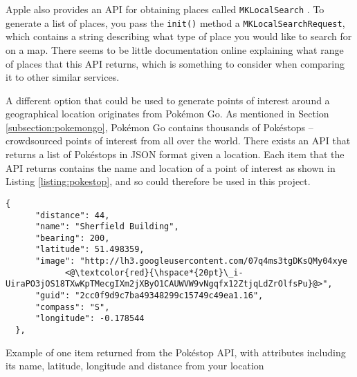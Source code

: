 Apple also provides an API for obtaining places called \texttt{MKLocalSearch} \cite{AppleInc.b}. To generate a list of places, you pass the \texttt{init()} method a \texttt{MKLocalSearchRequest}, which contains a string describing what type of place you would like to search for on a map. There seems to be little documentation online explaining what range of places that this API returns, which is something to consider when comparing it to other similar services.

A different option that could be used to generate points of interest around a geographical location originates from Pok\'{e}mon Go. As mentioned in Section \ref{subsection:pokemongo}, Pok\'{e}mon Go contains thousands of Pok\'{e}stops -- crowdsourced points of interest from all over the world. There exists an API \cite{Selwyn} that returns a list of Pok\'{e}stops in JSON format given a location. Each item that the API returns contains the name and location of a point of interest as shown in Listing \ref{listing:pokestop}, and so could therefore be used in this project.

\begin{listing}
  \centering
  \begin{lstlisting}[style=json]
  {
      "distance": 44, 
      "name": "Sherfield Building", 
      "bearing": 200, 
      "latitude": 51.498359, 
      "image": "http://lh3.googleusercontent.com/07q4ms3tgDKsQMy04xye
            <@\textcolor{red}{\hspace*{20pt}\_i-UiraPO3jOS18TXwKpTMecgIXm2jXByO1CAUWVW9vNgqfx12ZtjqLdZrOlfsPu}@>", 
      "guid": "2cc0f9d9c7ba49348299c15749c49ea1.16", 
      "compass": "S", 
      "longitude": -0.178544
  }, 
  \end{lstlisting}
  \caption{Example of one item returned from the Pok\'{e}stop API, with attributes including its name, latitude, longitude and distance from your location}
  \label{listing:pokestop}
\end{listing}






